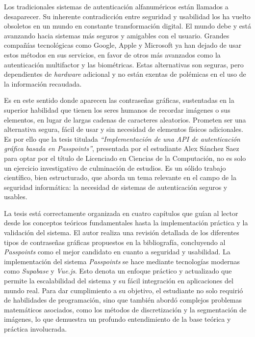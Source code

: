\begin{opinion}
	
   Los tradicionales sistemas de autenticación alfanuméricos están llamados a desaparecer. Su inherente contradicción entre seguridad y usabilidad los ha vuelto obsoletos en un mundo en constante transformación digital. El mundo debe y está avanzando hacia sistemas más seguros y amigables con el usuario. Grandes compañías tecnológicas como Google, Apple y Microsoft ya han dejado de usar estos métodos en sus servicios, en favor de otros más avanzados como la autenticación multifactor y las biométricas. Estas alternativas son seguras, pero dependientes de \textit{hardware} adicional y no están exentas de polémicas en el uso de la información recaudada.
   
   Es en este sentido donde aparecen las contraseñas gráficas, sustentadas en la superior habilidad que tienen los seres humanos de recordar imágenes o sus elementos, en lugar de largas cadenas de caracteres aleatorios. Prometen ser una alternativa segura, fácil de usar y sin necesidad de elementos físicos adicionales. Es por ello que la tesis titulada \textit{``Implementación de una API de autenticación gráfica basada en Passpoints''}, presentada por el estudiante Alex Sánchez Saez para optar por el título de Licenciado en Ciencias de la Computación, no es solo un ejercicio investigativo de culminación de estudios. Es un sólido trabajo científico, bien estructurado, que aborda un tema relevante en el campo de la seguridad informática: la necesidad de sistemas de autenticación seguros y usables.
   
   La tesis está correctamente organizada en cuatro capítulos que guían al lector desde los conceptos teóricos fundamentales hasta la implementación práctica y la validación del sistema. El autor realiza una revisión detallada de los diferentes tipos de contraseñas gráficas propuestos en la bibliografía, concluyendo al \textit{Passpoints} como el mejor candidato en cuanto a seguridad y usabilidad. La implementación del sistema \textit{Passpoints} se hace mediante tecnologías modernas como \textit{Supabase} y \textit{Vue.js}. Esto denota un enfoque práctico y actualizado que permite la escalabilidad del sistema y su fácil integración en aplicaciones del mundo real. Para dar cumplimiento a su objetivo, el estudiante no solo requirió de habilidades de programación, sino que también abordó complejos problemas matemáticos asociados, como los métodos de discretización y la segmentación de imágenes, lo que demuestra un profundo entendimiento de la base teórica y práctica involucrada.\\
   

\end{opinion}
